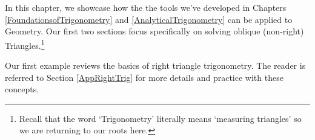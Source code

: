 \documentclass{ximera}
\begin{document}
	\author{Stitz-Zeager}




\setcounter{footnote}{0}

\label{TheLawofSines}

In this chapter, we showcase how the the tools we've developed in Chapters \ref{FoundationsofTrigonometry} and \ref{AnalyticalTrigonometry} can be applied to Geometry.  Our first two sections focus specifically on solving oblique (non-right) Triangles.\footnote{Recall that the word `Trigonometry' literally means `measuring triangles' so we are returning to our roots here.} 

\smallskip

Our first example reviews the basics of right triangle trigonometry.  The reader is referred to Section \ref{AppRightTrig} for more details and practice with these concepts.
\end{document}
